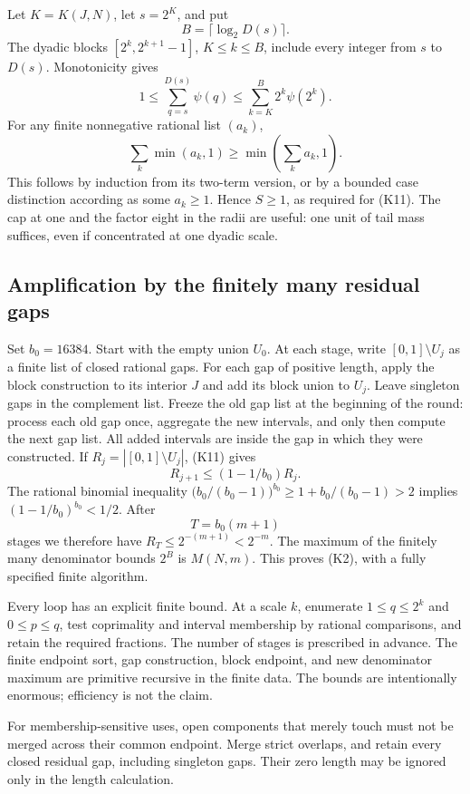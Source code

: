 Let $K=K(J,N)$, let $s=2^K$, and put
\[
 B=\lceil\log_2D(s)\rceil.
\]
The dyadic blocks $[2^k,2^{k+1}-1]$, $K\leq k\leq B$, include every
integer from $s$ to $D(s)$.  Monotonicity gives
\[
 1\leq\sum_{q=s}^{D(s)}\psi(q)
 \leq\sum_{k=K}^B 2^k\psi(2^k).
\]
For any finite nonnegative rational list $(a_k)$,
\[
 \sum_k\min(a_k,1)\geq\min\left(\sum_k a_k,1\right).
\]
This follows by induction from its two-term version, or by a bounded
case distinction according as some $a_k\geq1$.  Hence $S\geq1$, as
required for (K11).  The cap at one and the factor eight in the radii
are useful: one unit of tail mass suffices, even if concentrated at one
dyadic scale.

\subsection{Amplification by the finitely many residual gaps}

Set $b_0=16384$.  Start with the empty union $U_0$.  At each stage, write
$[0,1]\setminus U_j$ as a finite list of closed rational gaps.  For each
gap of positive length, apply the block construction to its interior
$J$ and add its block union to $U_j$.  Leave singleton gaps in the
complement list.  Freeze the old gap list at the beginning of the round:
process each old gap once, aggregate the new intervals, and only then
compute the next gap list.  All added intervals are inside the gap in which they
were constructed.  If $R_j=|[0,1]\setminus U_j|$, (K11) gives
\[
 R_{j+1}\leq(1-1/b_0)R_j.
\]
The rational binomial inequality
$\bigl(b_0/(b_0-1)\bigr)^{b_0}\geq1+b_0/(b_0-1)>2$
implies $(1-1/b_0)^{b_0}<1/2$.  After
\[
 T=b_0(m+1)
\]
stages we therefore have $R_T\leq2^{-(m+1)}<2^{-m}$.  The maximum of
the finitely many denominator bounds $2^B$ is $M(N,m)$.  This proves
(K2), with a fully specified finite algorithm.

Every loop has an explicit finite bound.  At a scale $k$, enumerate
$1\leq q\leq2^k$ and $0\leq p\leq q$, test coprimality and interval
membership by rational comparisons, and retain the required fractions.
The number of stages is prescribed in advance.  The finite endpoint
sort, gap construction, block endpoint, and new denominator maximum are
primitive recursive in the finite data.  The bounds are intentionally
enormous; efficiency is not the claim.

For membership-sensitive uses, open components that merely touch must
not be merged across their common endpoint.  Merge strict overlaps,
and retain every closed residual gap, including singleton gaps.  Their
zero length may be ignored only in the length calculation.

